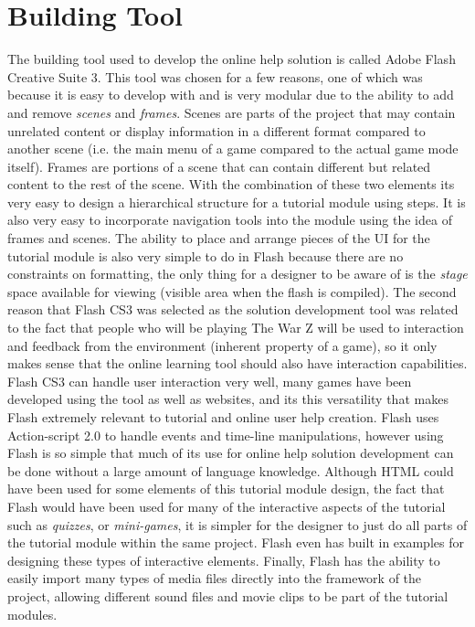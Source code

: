 \documentclass[12pt]{report}
\begin{document}
\section{Building Tool}
The building tool used to develop the online help solution is called Adobe Flash Creative Suite 3. This tool was chosen for a few reasons, one of which was because it is easy to develop with and is very modular due to the ability to add and remove \textit{scenes} and \textit{frames}. Scenes are parts of the project that may contain unrelated content or display information in a different format compared to another scene (i.e. the main menu of a game compared to the actual game mode itself). Frames are portions of a scene that can contain different but related content to the rest of the scene. With the combination of these two elements its very easy to design a hierarchical structure for a tutorial module using steps. It is also very easy to incorporate navigation tools into the module using the idea of frames and scenes. The ability to place and arrange pieces of the UI for the tutorial module is also very simple to do in Flash because there are no constraints on formatting, the only thing for a designer to be aware of is the \textit{stage} space available for viewing (visible area when the flash is compiled). The second reason that Flash CS3 was selected as the solution development tool was related to the fact that people who will be playing The War Z will be used to interaction and feedback from the environment (inherent property of a game), so it only makes sense that the online learning tool should also have interaction capabilities. Flash CS3 can handle user interaction very well, many games have been developed using the tool as well as websites, and its this versatility that makes Flash extremely relevant to tutorial and online user help creation. Flash uses Action-script 2.0 to handle events and time-line manipulations, however using Flash is so simple that much of its use for online help solution development can be done without a large amount of language knowledge. Although HTML could have been used for some elements of this tutorial module design, the fact that Flash would have been used for many of the interactive aspects of the tutorial such as \textit{quizzes}, or \textit{mini-games}, it is simpler for the designer to just do all parts of the tutorial module within the same project. Flash even has built in examples for designing these types of interactive elements. Finally, Flash has the ability to easily import many types of media files directly into the framework of the project, allowing different sound files and movie clips to be part of the tutorial modules.
\end{document}
